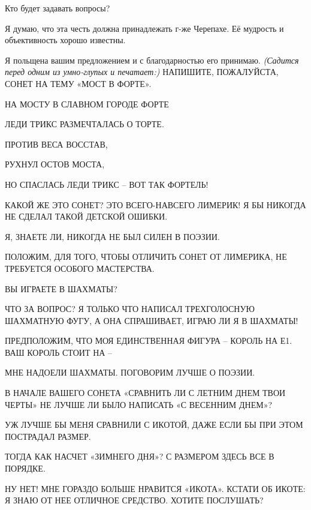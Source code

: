 \documentclass[../main.tex]{subfiles}
\begin{document}
\begin{dialogue}

 Кто будет задавать вопросы?

 Я думаю, что эта честь должна принадлежать г-же Черепахе. Её мудрость и объективность хорошо известны.

 Я польщена вашим предложением и с благодарностью его принимаю. \emph{(Садится перед одним из умно-глупых и печатает:)} НАПИШИТЕ, ПОЖАЛУЙСТА, СОНЕТ НА ТЕМУ «МОСТ В ФОРТЕ».


 НА МОСТУ В СЛАВНОМ ГОРОДЕ ФОРТЕ

ЛЕДИ ТРИКС РАЗМЕЧТАЛАСЬ О ТОРТЕ.

ПРОТИВ ВЕСА ВОССТАВ,

РУХНУЛ ОСТОВ МОСТА,

НО СПАСЛАСЬ ЛЕДИ ТРИКС \--- ВОТ ТАК ФОРТЕЛЬ!

 КАКОЙ ЖЕ ЭТО СОНЕТ? ЭТО ВСЕГО-НАВСЕГО ЛИМЕРИК! Я БЫ НИКОГДА НЕ СДЕЛАЛ ТАКОЙ ДЕТСКОЙ ОШИБКИ.

 Я, ЗНАЕТЕ ЛИ, НИКОГДА НЕ БЫЛ СИЛЕН В ПОЭЗИИ.

 ПОЛОЖИМ, ДЛЯ ТОГО, ЧТОБЫ ОТЛИЧИТЬ СОНЕТ ОТ ЛИМЕРИКА, НЕ ТРЕБУЕТСЯ ОСОБОГО МАСТЕРСТВА.

 ВЫ ИГРАЕТЕ В ШАХМАТЫ?

 ЧТО ЗА ВОПРОС? Я ТОЛЬКО ЧТО НАПИСАЛ ТРЕХГОЛОСНУЮ ШАХМАТНУЮ ФУГУ, А ОНА СПРАШИВАЕТ, ИГРАЮ ЛИ Я В ШАХМАТЫ!

 ПРЕДПОЛОЖИМ, ЧТО МОЯ ЕДИНСТВЕННАЯ ФИГУРА \--- КОРОЛЬ НА Е1. ВАШ КОРОЛЬ СТОИТ НА \---

 МНЕ НАДОЕЛИ ШАХМАТЫ. ПОГОВОРИМ ЛУЧШЕ О ПОЭЗИИ.

 В НАЧАЛЕ ВАШЕГО СОНЕТА «СРАВНИТЬ ЛИ С ЛЕТНИМ ДНЕМ ТВОИ ЧЕРТЫ» НЕ ЛУЧШЕ ЛИ БЫЛО НАПИСАТЬ «С ВЕСЕННИМ ДНЕМ»?

 УЖ ЛУЧШЕ БЫ МЕНЯ СРАВНИЛИ С ИКОТОЙ, ДАЖЕ ЕСЛИ БЫ ПРИ ЭТОМ ПОСТРАДАЛ РАЗМЕР.

 ТОГДА КАК НАСЧЕТ «ЗИМНЕГО ДНЯ»? С РАЗМЕРОМ ЗДЕСЬ ВСЕ В ПОРЯДКЕ.

 НУ НЕТ! МНЕ ГОРАЗДО БОЛЬШЕ НРАВИТСЯ «ИКОТА». КСТАТИ ОБ ИКОТЕ: Я ЗНАЮ ОТ НЕЕ ОТЛИЧНОЕ СРЕДСТВО. ХОТИТЕ ПОСЛУШАТЬ?


\end{dialogue}
\end{document}
